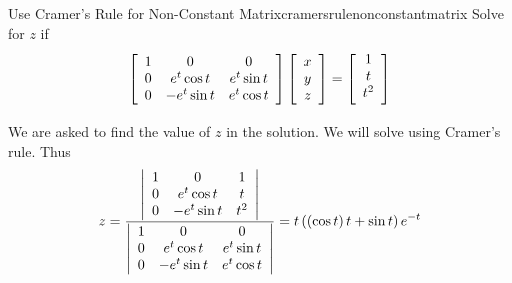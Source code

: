 \begin{example}{Use Cramer's Rule for Non-Constant Matrix}{cramersrulenonconstantmatrix}
Solve for $z$ if
\begin{equation*}
\leftB
\begin{array}{ccc}
1 & 0 & 0 \\
0 & e^{t}\cos t & e^{t}\sin t \\
0 & -e^{t}\sin t & e^{t}\cos t
\end{array}
\rightB \leftB
\begin{array}{c}
x \\
y \\
z
\end{array}
\rightB =\leftB
\begin{array}{c}
1 \\
t \\
\vspace{0.05in}t^{2}
\end{array}
\rightB
\end{equation*}
\end{example}

\begin{solution} We are asked to find the value of $z$ in the solution. We will solve using Cramer's rule.
 Thus
\begin{equation*}
z=\vspace{.05in} \frac{\left|
\begin{array}{ccc}
1 & 0 & 1 \\
0 & e^{t}\cos t & t \\
0 & -e^{t}\sin t & t^{2}
\end{array}
\right| }{\left|
\begin{array}{ccc}
1 & 0 & 0 \\
0 & e^{t}\cos t & e^{t}\sin t \\
0 & -e^{t}\sin t & e^{t}\cos t
\end{array}
\right| }=\allowbreak t\left( \left( \cos t\right) t+\sin t\right) e^{-t}
\end{equation*}
\end{solution}